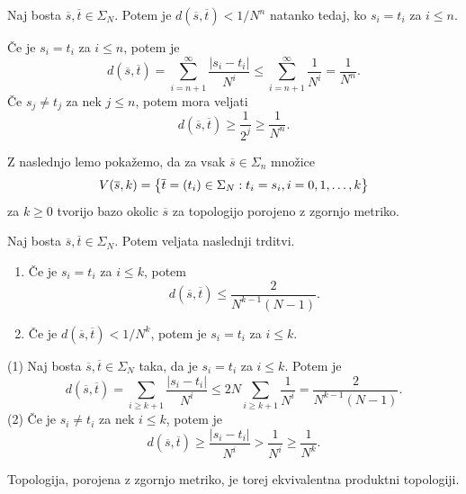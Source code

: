 \begin{izrek} \label{thm:blizu}
    Naj bosta \(\overline{s}, \overline{t} \in \Sigma_N\). Potem je \(d(\overline{s}, \overline{t}) < 1/N^n\) natanko tedaj, ko \(s_i = t_i\) za \(i \leq n\).
\end{izrek}

\begin{dokaz}
    Če je \(s_i = t_i\) za \(i \leq n\), potem je
    \[d(\overline{s}, \overline{t}) = \sum_{i = n + 1}^{\infty} \frac{|s_i - t_i|}{N^i} \leq \sum_{i = n + 1}^{\infty} \frac{1}{N^i} = \frac{1}{N^n}.\]
    Če \(s_j \neq t_j\) za nek \(j \leq n\), potem mora veljati
    \[d(\overline{s}, \overline{t}) \geq \frac{1}{2^j} \geq \frac{1}{N^n}.\]
\end{dokaz}

\noindent Z naslednjo lemo pokažemo, da za vsak \(\overline{s} \in \Sigma_n\) množice
\[V(\overline{s}, k) = \left\{ \overline{t} = (t_i) \in \Sigma_N : t_i = s_i, i = 0, 1, \dots, k \right\}\]
za \(k \geq 0\) tvorijo bazo okolic \(\overline{s}\) za topologijo porojeno z zgornjo metriko.

\begin{lema} \label{lem:seq-metric}
    Naj bosta \(\overline{s}, \overline{t} \in \Sigma_N\). Potem veljata naslednji trditvi.
    \begin{enumerate}[label=(\arabic*)]
        \item Če je \(s_i = t_i\) za \(i \leq k\), potem \[d (\overline{s}, \overline{t}) \leq \frac{2}{N^{k - 1} (N - 1)}.\]
        \item Če je \(d (\overline{s}, \overline{t}) < 1 / N^k\), potem je \(s_i = t_i\) za \(i \leq k\).
    \end{enumerate}
\end{lema}

\begin{dokaz}
    (1) Naj bosta \(\overline{s}, \overline{t} \in \Sigma_N\) taka, da je \(s_i = t_i\) za \(i \leq k\). Potem je
    \[d (\overline{s}, \overline{t}) = \sum_{i \geq k + 1} \frac{|s_i - t_i|}{N^i} \leq 2 N \sum_{i \geq k + 1} \frac{1}{N^i} = \frac{2}{N^{k - 1} (N - 1)}.\]
    (2) Če je \(s_i \neq t_i\) za nek \(i \leq k\), potem je
    \[d (\overline{s}, \overline{t}) \geq \frac{|s_i - t_i|}{N^i} > \frac{1}{N^i} \geq \frac{1}{N^k}.\]
\end{dokaz}

\noindent Topologija, porojena z zgornjo metriko, je torej ekvivalentna produktni topologiji.

